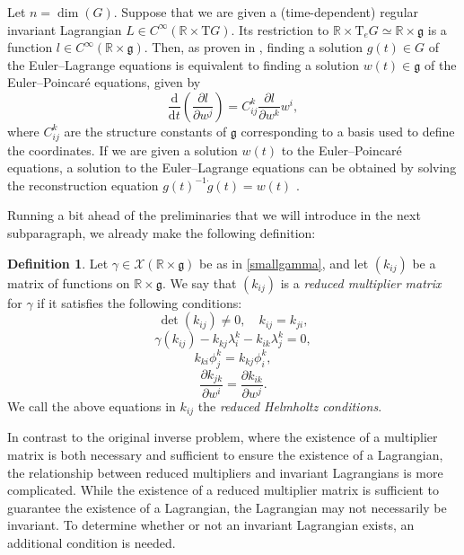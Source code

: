 \documentclass[11pt]{article}
\theoremstyle{plain}
\theoremstyle{definition}
\newtheorem{definition}{Definition}
\begin{document}
Let $n=\dim(G)$. Suppose that we are given a (time-dependent) regular invariant Lagrangian $L\in C^{\infty}(\mathbb{R}\times \mathrm{T}G)$. Its restriction to $\mathbb{R}\times \mathrm{T}_e G\simeq \mathbb{R}\times \mathfrak{g}$ is a function $l\in C^{\infty}(\mathbb{R}\times \mathfrak{g})$. Then, as proven in \cite{marsden1999eulerpoincare}, finding a solution $g(t)\in G$ of the Euler--Lagrange equations is equivalent to finding a solution $w(t)\in \mathfrak{g}$ of the Euler--Poincar{\'e} equations, given by
\begin{equation*}
    \frac{\mathrm{d}}{\mathrm{d}t}\left(\frac{\partial l}{\partial w^j}\right)=C_{ij}^k \frac{\partial l}{\partial w^k}w^i,
\end{equation*}
where $C_{ij}^k$ are the structure constants of $\mathfrak{g}$ corresponding to a basis used to define the coordinates. If we are given a solution $w(t)$ to the Euler--Poincar{\'e} equations, a solution to the Euler--Lagrange equations can be obtained by solving the reconstruction equation $g(t)^{-1}\dot{g}(t)=w(t)$ \cite{mestdag2008lagrangepoincare}.

Running a bit ahead of the preliminaries that we will introduce in the next subparagraph, we already make the following definition:

\begin{definition}\label{def:reducedmultiplier}
Let $\gamma\in \mathcal{X}(\mathbb{R}\times \mathfrak{g})$ be as in \eqref{smallgamma}, and let $(k_{ij})$ be a matrix of functions on $\mathbb{R}\times \mathfrak{g}$. We say that $(k_{ij})$ is a \emph{reduced multiplier matrix} for $\gamma$ if it satisfies the following conditions:
\begin{equation*}
    \det(k_{ij})\neq 0,\quad k_{ij}=k_{ji},
\end{equation*}
\begin{equation*}
    \gamma(k_{ij})-k_{kj}\lambda_i^k-k_{ik}\lambda_j^k=0,
\end{equation*}
\begin{equation*}
    k_{ki}\phi_j^k=k_{kj}\phi_i^k,
\end{equation*}
\begin{equation*}
    \frac{\partial k_{jk}}{\partial w^i}=\frac{\partial k_{ik}}{\partial w^j}.
\end{equation*}
We call the above equations in $k_{ij}$ the \emph{reduced Helmholtz conditions}.
\end{definition}

In contrast to the original inverse problem, where the existence of a multiplier matrix is both necessary and sufficient to ensure the existence of a Lagrangian, the relationship between reduced multipliers and invariant Lagrangians is more complicated. While the existence of a reduced multiplier matrix is sufficient to guarantee the existence of a Lagrangian, the Lagrangian may not necessarily be invariant. To determine whether or not an invariant Lagrangian exists, an additional condition is needed.
\end{document}
